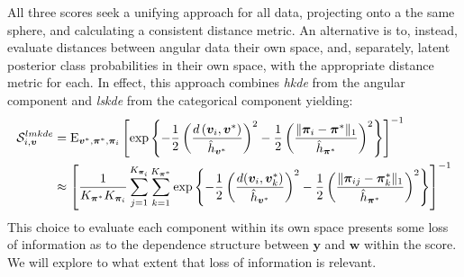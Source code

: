 All three scores seek a unifying approach for all data, projecting onto a the same 
    sphere, and calculating a 
    consistent distance metric.  An alternative is to, instead, evaluate distances 
    between angular data their own space, and, separately, latent posterior class 
    probabilities in their own space, with the appropriate distance metric for 
    each.  In effect, this approach combines \emph{hkde} from
    the angular component and \emph{lskde} from the categorical component yielding:
    \begin{equation}
    \label{eqn:lmkdecat}
    \begin{aligned}
    \mathcal{S}_{i,\bm{v}}^{lmkde} &= \text{E}_{\bm{v}^*,\bm{\pi}^*,\bm{\pi}_i}\left[
        \exp
        \left\lbrace 
        -\frac{1}{2}
        \left(
        \frac{d\left(\bm{v}_i, \bm{v}^*\right)}{\hat{h}_{\bm{v}^*}}
        \right)^2
        -\frac{1}{2}
        \left(
        \frac{\lVert\bm{\pi}_i - \bm{\pi}^*\rVert_1}{\hat{h}_{\bm{\pi}^*}}
        \right)^2
        \right\rbrace
        \right]^{-1}\\
        &\approx \left[\frac{1}{K_{\bm{\pi}^*}K_{\bm{\pi}_i}}
            \sum_{j = 1}^{K_{\bm{\pi}_i}}\sum_{k=1}^{K_{\bm{\pi}^*}}
            \exp\left\lbrace-\frac{1}{2}
            \left(\frac{d(\bm{v}_i,\bm{v}_k^*)}{\hat{h}_{\bm{v}^*}}\right)^2
            -\frac{1}{2}\left(
            \frac{\lVert\bm{\pi}_{ij} - \bm{\pi}_k^*\rVert_1}{\hat{h}_{\bm{\pi}^*}}
            \right)^2
            \right\rbrace\right]^{-1}
    \end{aligned}
    \end{equation}
    This choice to evaluate each component within its own space presents some 
    loss of information as to the dependence structure between $\bm{y}$ and 
    $\bm{w}$ within the score.  We will explore to what extent that loss of 
    information is relevant.

